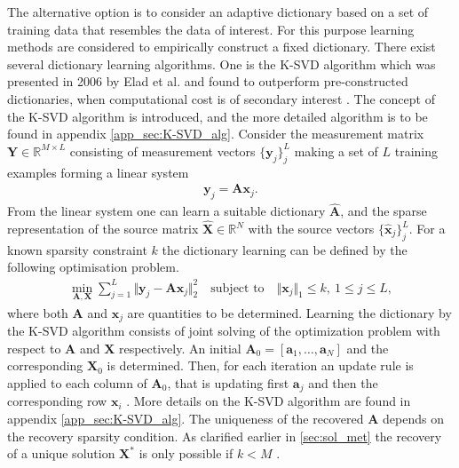 The alternative option is to consider an adaptive dictionary based on a set of training data that resembles the data of interest. 
For this purpose learning methods are considered to empirically construct a fixed dictionary. 
There exist several dictionary learning algorithms. One is the K-SVD algorithm which was presented in 2006 by Elad et al. and found to outperform pre-constructed dictionaries, when computational cost is of secondary interest \cite{Elad2006}. 
The concept of the K-SVD algorithm is introduced, and the more detailed algorithm is to be found in appendix \ref{app_sec:K-SVD_alg}. 
Consider the measurement matrix $\mathbf{Y} \in \mathbb{R}^{M \times L}$ consisting of measurement vectors $\lbrace \mathbf{y}_j \rbrace_j^L$  making a set of $L$ training examples forming a linear system
\begin{align*}
\mathbf{y}_j = \mathbf{A} \mathbf{x}_j.
\end{align*}
From the linear system one can learn a suitable dictionary $\hat{\mathbf{A}}$, and the sparse representation of the source matrix $\hat{\mathbf{X}} \in \mathbb{R}^N$ with the source vectors $\lbrace \hat{\mathbf{x}}_j \rbrace_j^L$.
For a known sparsity constraint $k$ the dictionary learning can be defined by the following optimisation problem. 
\begin{align}\label{eq:SVD1}
\min_{\mathbf{A}, \mathbf{X}} \sum_{j=1}^{L} \Vert \mathbf{y}_j - \mathbf{A} \mathbf{x}_j \Vert_2^2 \quad \text{subject to} \quad \Vert \textbf{x}_j \Vert_1 \leq k, \ 1 \leq j \leq L,
\end{align}
where both $\textbf{A}$ and $\textbf{x}_j$ are quantities to be determined.
Learning the dictionary by the K-SVD algorithm consists of joint solving of the optimization problem with respect to $\mathbf{A}$ and $\mathbf{X}$ respectively. 
An initial $\textbf{A}_0 = [\textbf{a}_1,\hdots,\textbf{a}_N]$ and the corresponding $\textbf{X}_0$ is determined. Then, for each iteration an update rule is applied to each column of $\textbf{A}_0$, that is updating first $\textbf{a}_j$ and then the corresponding row $\textbf{x}_i$ . 
More details on the K-SVD algorithm are found in appendix \ref{app_sec:K-SVD_alg}. 
The uniqueness of the recovered $\mathbf{A}$ depends on the recovery sparsity condition. As clarified earlier in \ref{sec:sol_met} the recovery of a unique solution $\mathbf{X}^\ast$ is only possible if $k < M$ \cite{phd2015}.


